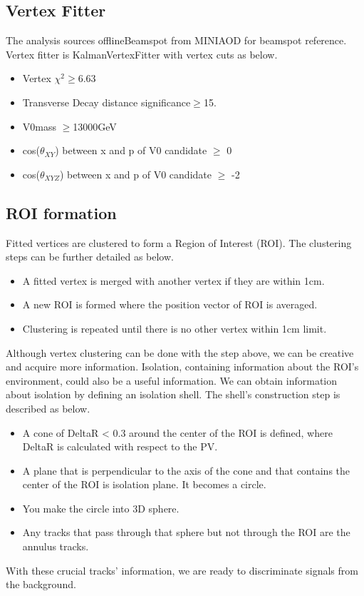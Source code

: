 \subsection{Vertex Fitter}\label{sec:ROI_V0Fitter}

The analysis sources offlineBeamspot from MINIAOD for beamspot reference.
Vertex fitter is KalmanVertexFitter with vertex cuts as below.
\begin{itemize}
  \item Vertex $\chi^{2}\geq$6.63 
  \item Transverse Decay distance significance$\geq$15.
  \item V0mass $\geq$13000GeV
  \item cos($\theta_{XY}$) between x and p of V0 candidate $\geq$ 0
  \item cos($\theta_{XYZ}$) between x and p of V0 candidate $\geq$ -2
\end{itemize}

\subsection{ROI formation}\label{sec:ROI_ROIformation}
Fitted vertices are clustered to form a Region of Interest (ROI).
The clustering steps can be further detailed as below.
\begin{itemize}
  \item A fitted vertex is merged with another vertex if they are within 1cm. 
  \item A new ROI is formed where the position vector of ROI is averaged.
  \item Clustering is repeated until there is no other vertex within 1cm limit.
\end{itemize}

Although vertex clustering can be done with the step above, we can be creative and acquire more information.
Isolation, containing information about the ROI's environment, could also be a useful information.
We can obtain information about isolation by defining an isolation shell.
The shell's construction step is described as below.
\begin{itemize}
  \item A cone of DeltaR < 0.3 around the center of the ROI is defined, where DeltaR is calculated with respect to the PV. 
  \item	A plane that is perpendicular to the axis of the cone and that contains the center of the ROI is isolation plane. It becomes a circle. 
  \item You make the circle into 3D sphere.
  \item Any tracks that pass through that sphere but not through the ROI are the annulus tracks.
\end{itemize}
With these crucial tracks' information, we are ready to discriminate signals from the background.

